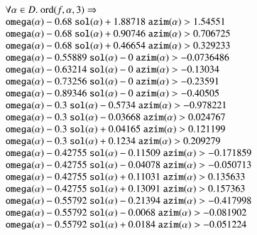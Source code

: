 $$
\begin{array}{lll}
\leftalign\\
\forall\alpha\in D. \ \op{ord}(f,\alpha,3) \Rightarrow \\
   \optt{omega}(\alpha) - 0.68\ \optt{sol}(\alpha) + 1.88718\ \optt{azim}(\alpha) > 1.54551 \\
   \optt{omega}(\alpha) - 0.68\ \optt{sol}(\alpha) + 0.90746\ \optt{azim}(\alpha) > 0.706725\\
   \optt{omega}(\alpha) - 0.68\ \optt{sol}(\alpha) + 0.46654\ \optt{azim}(\alpha) > 0.329233\\
   \optt{omega}(\alpha) - 0.55889\ \optt{sol}(\alpha) - 0\ \optt{azim}(\alpha) > -0.0736486\\
   \optt{omega}(\alpha) - 0.63214\ \optt{sol}(\alpha) - 0\ \optt{azim}(\alpha) > -0.13034\\
   \optt{omega}(\alpha) - 0.73256\ \optt{sol}(\alpha) - 0\ \optt{azim}(\alpha) > -0.23591\\
   \optt{omega}(\alpha) - 0.89346\ \optt{sol}(\alpha) - 0\ \optt{azim}(\alpha) > -0.40505\\
   \optt{omega}(\alpha) - 0.3\ \optt{sol}(\alpha) - 0.5734\ \optt{azim}(\alpha) > -0.978221\\
   \optt{omega}(\alpha) - 0.3\ \optt{sol}(\alpha) - 0.03668\ \optt{azim}(\alpha) > 0.024767\\
   \optt{omega}(\alpha) - 0.3\ \optt{sol}(\alpha) + 0.04165\ \optt{azim}(\alpha) > 0.121199\\
   \optt{omega}(\alpha) - 0.3\ \optt{sol}(\alpha) + 0.1234\ \optt{azim}(\alpha) > 0.209279\\
   \optt{omega}(\alpha) - 0.42755\ \optt{sol}(\alpha) - 0.11509\ \optt{azim}(\alpha) > -0.171859\\
   \optt{omega}(\alpha) - 0.42755\ \optt{sol}(\alpha) - 0.04078\ \optt{azim}(\alpha) > -0.050713\\
   \optt{omega}(\alpha) - 0.42755\ \optt{sol}(\alpha) + 0.11031\ \optt{azim}(\alpha) > 0.135633\\
   \optt{omega}(\alpha) - 0.42755\ \optt{sol}(\alpha) + 0.13091\ \optt{azim}(\alpha) > 0.157363\\
   \optt{omega}(\alpha) - 0.55792\ \optt{sol}(\alpha) - 0.21394\ \optt{azim}(\alpha) > -0.417998\\
   \optt{omega}(\alpha) - 0.55792\ \optt{sol}(\alpha) - 0.0068\ \optt{azim}(\alpha) > -0.081902\\
   \optt{omega}(\alpha) - 0.55792\ \optt{sol}(\alpha) + 0.0184\ \optt{azim}(\alpha) > -0.051224\\

\end{array}$$
